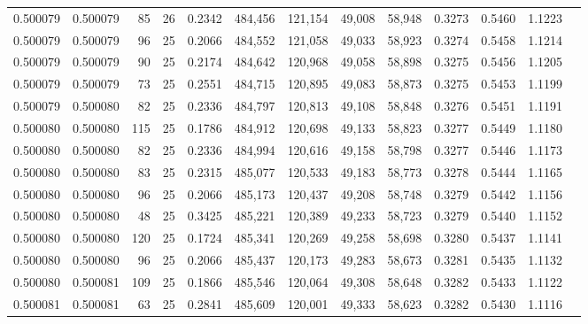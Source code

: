 \begin{tabular}{rrrrrrrrrrrrr}
0.500079 & 0.500079 &    85 &  26 &                                     0.2342 & 484,456 & 121,154 &  49,008 &  58,948 & 0.3273 & 0.5460 & 1.1223 \\
0.500079 & 0.500079 &    96 &  25 &                                     0.2066 & 484,552 & 121,058 &  49,033 &  58,923 & 0.3274 & 0.5458 & 1.1214 \\
0.500079 & 0.500079 &    90 &  25 &                                     0.2174 & 484,642 & 120,968 &  49,058 &  58,898 & 0.3275 & 0.5456 & 1.1205 \\
0.500079 & 0.500079 &    73 &  25 &                                     0.2551 & 484,715 & 120,895 &  49,083 &  58,873 & 0.3275 & 0.5453 & 1.1199 \\
0.500079 & 0.500080 &    82 &  25 &                                     0.2336 & 484,797 & 120,813 &  49,108 &  58,848 & 0.3276 & 0.5451 & 1.1191 \\
0.500080 & 0.500080 &   115 &  25 &                                     0.1786 & 484,912 & 120,698 &  49,133 &  58,823 & 0.3277 & 0.5449 & 1.1180 \\
0.500080 & 0.500080 &    82 &  25 &                                     0.2336 & 484,994 & 120,616 &  49,158 &  58,798 & 0.3277 & 0.5446 & 1.1173 \\
0.500080 & 0.500080 &    83 &  25 &                                     0.2315 & 485,077 & 120,533 &  49,183 &  58,773 & 0.3278 & 0.5444 & 1.1165 \\
0.500080 & 0.500080 &    96 &  25 &                                     0.2066 & 485,173 & 120,437 &  49,208 &  58,748 & 0.3279 & 0.5442 & 1.1156 \\
0.500080 & 0.500080 &    48 &  25 &                                     0.3425 & 485,221 & 120,389 &  49,233 &  58,723 & 0.3279 & 0.5440 & 1.1152 \\
0.500080 & 0.500080 &   120 &  25 &                                     0.1724 & 485,341 & 120,269 &  49,258 &  58,698 & 0.3280 & 0.5437 & 1.1141 \\
0.500080 & 0.500080 &    96 &  25 &                                     0.2066 & 485,437 & 120,173 &  49,283 &  58,673 & 0.3281 & 0.5435 & 1.1132 \\
0.500080 & 0.500081 &   109 &  25 &                                     0.1866 & 485,546 & 120,064 &  49,308 &  58,648 & 0.3282 & 0.5433 & 1.1122 \\
0.500081 & 0.500081 &    63 &  25 &                                     0.2841 & 485,609 & 120,001 &  49,333 &  58,623 & 0.3282 & 0.5430 & 1.1116 \\

\end{tabular}
